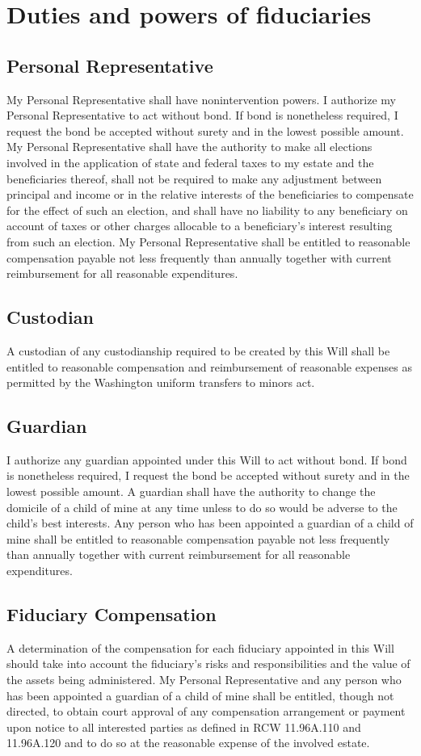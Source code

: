 \documentclass[11.5pt]{article}
\begin{document}
\section{Duties and powers of fiduciaries}
\subsection{Personal Representative}
My Personal Representative shall have nonintervention powers. I authorize my Personal Representative to act without bond. If bond is nonetheless required, I request the bond be accepted without surety and in the lowest possible amount. My Personal Representative shall have the authority to make all elections involved in the application of state and federal taxes to my estate and the beneficiaries thereof, shall not be required to make any adjustment between principal and income or in the relative interests of the beneficiaries to compensate for the effect of such an election, and shall have no liability to any beneficiary on account of taxes or other charges allocable to a beneficiary’s interest resulting from such an election. My Personal Representative shall be entitled to reasonable compensation payable not less frequently than annually together with current reimbursement for all reasonable expenditures.

\subsection{Custodian}
A custodian of any custodianship required to be created by this Will shall be entitled to reasonable compensation and reimbursement of reasonable expenses as permitted by the Washington uniform transfers to minors act.

\subsection{Guardian}
I authorize any guardian appointed under this Will to act without bond. If bond is nonetheless required, I request the bond be accepted without surety and in the lowest possible amount. A guardian shall have the authority to change the domicile of a child of mine at any time unless to do so would be adverse to the child’s best interests. Any person who has been appointed a guardian of a child of mine shall be entitled to reasonable compensation payable not less frequently than annually together with current reimbursement for all reasonable expenditures.

\subsection{Fiduciary Compensation} A determination of the compensation for each fiduciary appointed in this Will should take into account the fiduciary’s risks and responsibilities and the value of the assets being administered. My Personal Representative and any person who has been appointed a guardian of a child of mine shall be entitled, though not directed, to obtain court approval of any compensation arrangement or payment upon notice to all interested parties as defined in RCW 11.96A.110 and 11.96A.120 and to do so at the reasonable expense of the involved estate.
\end{document}
